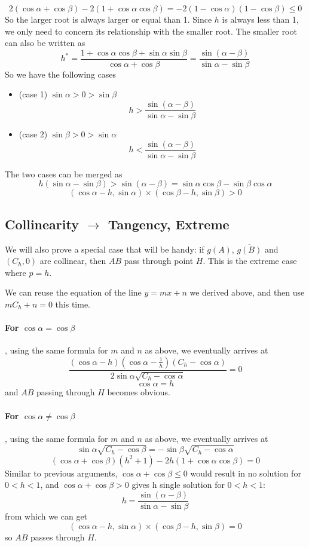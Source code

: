 \documentclass[]{article}
\begin{document}
\begin{itemize}
\[
2(\cos\alpha+\cos\beta) - 2(1+\cos\alpha\cos\beta) = -2(1-\cos\alpha)(1-\cos\beta) \le 0
\]
So the larger root is always larger or equal than 1. Since $h$ is always less than 1, we only need to concern its relationship with the smaller root. The smaller root can also be written as
\[
h^* = \frac{1 + \cos \alpha\cos \beta+ \sin \alpha\sin\beta}{\cos\alpha + \cos\beta} = \frac{\sin(\alpha-\beta)}{\sin\alpha - \sin\beta}
\]
So we have the following cases
\begin{itemize}
	\item (case 1) $\sin\alpha > 0 > \sin\beta$
	\[
	 h > \frac{\sin(\alpha-\beta)}{\sin\alpha - \sin\beta}
	\] 
	\item (case 2) $\sin\beta > 0 > \sin\alpha$
	\[
	h < \frac{\sin(\alpha-\beta)}{\sin\alpha - \sin\beta}
	\]
\end{itemize}
The two cases can be merged as
\[
h(\sin\alpha - \sin\beta) > \sin(\alpha-\beta) = \sin\alpha\cos\beta - \sin\beta\cos\alpha
\]
\[
(\cos\alpha-h, \sin\alpha)\times(\cos\beta-h, \sin\beta) > 0
\]
\end{itemize}

\subsection{Collinearity $\to$ Tangency, Extreme}
We will also prove a special case that will be handy: if $g(A)$, $\overline{g(B)}$ and $(C_h, 0)$ are collinear, then $AB$ pass through point $H$. This is the extreme case where $p = h$.

We can reuse the equation of the line $y=mx+n$ we derived above, and then use $mC_h+n = 0$ this time.

\paragraph{For $\cos\alpha = \cos\beta$}, using the same formula for $m$ and $n$ as above, we eventually arrives at
\[
\frac{(\cos\alpha-h)\left(\cos\alpha-\frac{1}{h}\right)(C_h-\cos\alpha)}{2\sin\alpha\sqrt{C_h-\cos\alpha}} = 0
\]
\[
\cos\alpha = h
\]
and $AB$ passing through $H$ becomes obvious.
\paragraph{For $\cos\alpha \neq \cos\beta$}, using the same formula for $m$ and $n$ as above, we eventually arrives at
\[
\sin\alpha\sqrt{C_h-\cos\beta} = - \sin\beta\sqrt{C_h-\cos\alpha}
\]
\[
(\cos\alpha+\cos\beta)(h^2 + 1) - 2h(1+\cos\alpha\cos\beta) = 0
\]
Similar to previous arguments, $\cos\alpha+\cos\beta \leq0$ would result in no solution for $0 < h <1$, and $\cos\alpha+\cos\beta >0$ gives h single solution for $0 < h <1$:
\[
h = \frac{\sin(\alpha-\beta)}{\sin\alpha - \sin\beta}
\]
from which we can get
\[
(\cos\alpha-h, \sin\alpha)\times(\cos\beta-h, \sin\beta) = 0
\]
so $AB$ passes through $H$.
\end{document}
